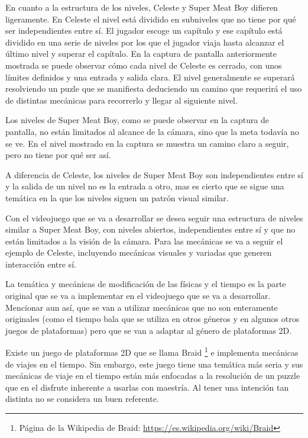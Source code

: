 En cuanto a la estructura de los niveles, Celeste y Super Meat Boy difieren ligeramente. En Celeste el nivel está dividido en subniveles que no tiene por qué ser independientes entre sí. El jugador escoge un capítulo y ese capítulo está dividido en una serie de niveles por los que el jugador viaja hasta alcanzar el último nivel y superar el capítulo. En la captura de pantalla anteriormente mostrada se puede observar cómo cada nivel de Celeste es cerrado, con unos límites definidos y una entrada y salida clara. El nivel generalmente se superará resolviendo un puzle que se manifiesta deduciendo un camino que requerirá el uso de distintas mecánicas para recorrerlo y llegar al siguiente nivel.

Los niveles de Super Meat Boy, como se puede observar en la captura de pantalla, no están limitados al alcance de la cámara, sino que la meta todavía no se ve. En el nivel mostrado en la captura se muestra un camino claro a seguir, pero no tiene por qué ser así.

A diferencia de Celeste, los niveles de Super Meat Boy son independientes entre sí y la salida de un nivel no es la entrada a otro, mas es cierto que se sigue una temática en la que los niveles siguen un patrón visual similar. 

Con el videojuego que se va a desarrollar se desea seguir una estructura de niveles similar a Super Meat Boy, con niveles abiertos, independientes entre sí y que no están limitados a la visión de la cámara.
Para las mecánicas se va a seguir el ejemplo de Celeste, incluyendo mecánicas visuales y variadas que generen interacción entre sí.

La temática y mecánicas de modificación de las físicas y el tiempo es la parte original que se va a implementar en el videojuego que se va a desarrollar. Mencionar aun así, que se van a utilizar mecánicas que no son enteramente originales (como el tiempo bala que se utiliza en otros géneros y en algunos otros juegos de plataformas) pero que se van a adaptar al género de plataformas 2D.

Existe un juego de plataformas 2D que se llama Braid \footnote{Página de la Wikipedia de Braid: \url{https://es.wikipedia.org/wiki/Braid}} e implementa mecánicas de viajes en el tiempo. Sin embargo, este juego tiene una temática más seria y sus mecánicas de viaje en el tiempo están más enfocadas a la resolución de un puzzle que en el disfrute inherente a usarlas con maestría. Al tener una intención tan distinta no se considera un buen referente.

